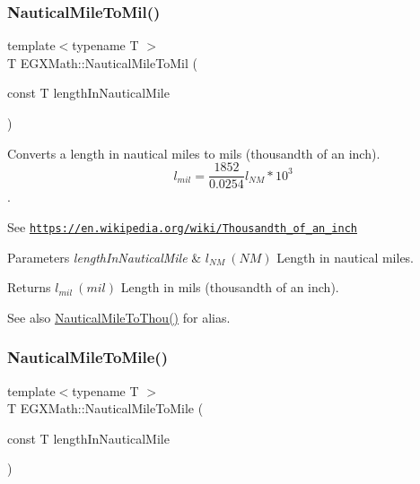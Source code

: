 \subsubsection{\texorpdfstring{Nautical\+Mile\+To\+Mil()}{NauticalMileToMil()}}
{\footnotesize\ttfamily template$<$typename T $>$ \\
T E\+G\+X\+Math\+::\+Nautical\+Mile\+To\+Mil (\begin{DoxyParamCaption}\item[{const T}]{length\+In\+Nautical\+Mile }\end{DoxyParamCaption})}



Converts a length in nautical miles to mils (thousandth of an inch). \[ l_{mil}= \frac{1852}{0.0254} l_{NM} * 10^{3} \]. 

See \href{https://en.wikipedia.org/wiki/Thousandth_of_an_inch}{\tt https\+://en.\+wikipedia.\+org/wiki/\+Thousandth\+\_\+of\+\_\+an\+\_\+inch} 
\begin{DoxyParams}{Parameters}
{\em length\+In\+Nautical\+Mile} & $ l_{NM}\ (NM)$ Length in nautical miles. \\
\hline
\end{DoxyParams}
\begin{DoxyReturn}{Returns}
$ l_{mil}\ (mil)$ Length in mils (thousandth of an inch). 
\end{DoxyReturn}
\begin{DoxySeeAlso}{See also}
\mbox{\hyperlink{group___e_g_x_math-_conversions-_length_conversions-_non-_s_i-_nautical_mile-_imperial_ga2791d7d115ca8640a88ce3180db9dddb}{Nautical\+Mile\+To\+Thou()}} for alias. 
\end{DoxySeeAlso}
\mbox{\label{group___e_g_x_math-_conversions-_length_conversions-_non-_s_i-_nautical_mile-_imperial_ga9be4e73b064274bd79a406d7ed69d21f}} 
\subsubsection{\texorpdfstring{Nautical\+Mile\+To\+Mile()}{NauticalMileToMile()}}
{\footnotesize\ttfamily template$<$typename T $>$ \\
T E\+G\+X\+Math\+::\+Nautical\+Mile\+To\+Mile (\begin{DoxyParamCaption}\item[{const T}]{length\+In\+Nautical\+Mile }\end{DoxyParamCaption})}



